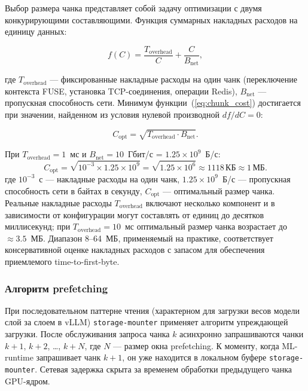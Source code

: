 Выбор размера чанка представляет собой задачу оптимизации с двумя конкурирующими составляющими. Функция суммарных накладных расходов на единицу данных:

\begin{equation}
f(C) = \frac{T_{\mathrm{overhead}}}{C} + \frac{C}{B_{\mathrm{net}}},
\label{eq:chunk_cost}
\end{equation}

где $T_{\mathrm{overhead}}$ --- фиксированные накладные расходы на один чанк (переключение контекста FUSE, установка TCP-соединения, операции Redis), $B_{\mathrm{net}}$ --- пропускная способность сети. Минимум функции~(\ref{eq:chunk_cost}) достигается при значении, найденном из условия нулевой производной $df/dC = 0$:

\begin{equation}
C_{\mathrm{opt}} = \sqrt{T_{\mathrm{overhead}} \cdot B_{\mathrm{net}}}.
\label{eq:chunk_opt}
\end{equation}

При $T_{\mathrm{overhead}} = 1$~мс и $B_{\mathrm{net}} = 10$~Гбит/с = $1.25 \times 10^9$~Б/с:
\begin{equation}
C_{\mathrm{opt}} = \sqrt{10^{-3} \times 1.25 \times 10^9} = \sqrt{1.25 \times 10^6} \approx 1118\,\text{КБ} \approx 1\,\text{МБ}.
\end{equation}
где $10^{-3}$~с --- накладные расходы на один чанк, $1.25 \times 10^9$~Б/с --- пропускная способность сети в байтах в секунду, $C_{\mathrm{opt}}$ --- оптимальный размер чанка.
Реальные накладные расходы $T_{\mathrm{overhead}}$ включают несколько компонент и в зависимости от конфигурации могут составлять от единиц до десятков миллисекунд; при $T_{\mathrm{overhead}} = 10$~мс оптимальный размер чанка возрастает до $\approx 3.5$~МБ. Диапазон 8--64~МБ, применяемый на практике, соответствует консервативной оценке накладных расходов с запасом для обеспечения приемлемого time-to-first-byte.

\subsubsection{Алгоритм prefetching}

При последовательном паттерне чтения (характерном для загрузки весов модели слой за слоем в vLLM) \texttt{storage-mounter} применяет алгоритм упреждающей загрузки. После обслуживания запроса чанка $k$ асинхронно запрашиваются чанки $k{+}1$, $k{+}2$, \ldots, $k{+}N$, где $N$ --- размер окна prefetching. К моменту, когда ML-runtime запрашивает чанк $k{+}1$, он уже находится в локальном буфере \texttt{storage-mounter}. Сетевая задержка скрыта за временем обработки предыдущего чанка GPU-ядром.

